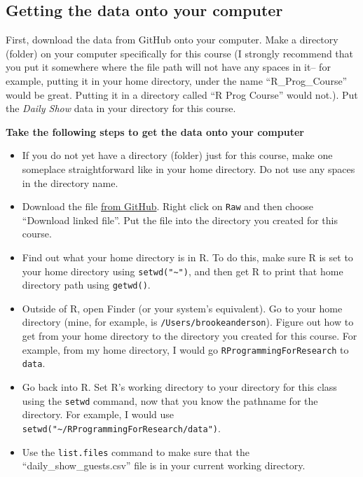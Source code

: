 \documentclass[]{book}
\providecommand{\tightlist}{%
  \setlength{\itemsep}{0pt}\setlength{\parskip}{0pt}}
\begin{document}
\subsection{Getting the data onto your
computer}\label{getting-the-data-onto-your-computer}

First, download the data from GitHub onto your computer. Make a
directory (folder) on your computer specifically for this course (I
strongly recommend that you put it somewhere where the file path will
not have any spaces in it-- for example, putting it in your home
directory, under the name ``R\_Prog\_Course'' would be great. Putting it
in a directory called ``R Prog Course'' would not.). Put the \emph{Daily
Show} data in your directory for this course.

\textbf{Take the following steps to get the data onto your computer}

\begin{itemize}
\tightlist
\item
  If you do not yet have a directory (folder) just for this course, make
  one someplace straightforward like in your home directory. Do not use
  any spaces in the directory name.
\item
  Download the file
  \href{https://github.com/geanders/RProgrammingForResearch/blob/master/data/daily_show_guests.csv}{from
  GitHub}. Right click on \texttt{Raw} and then choose ``Download linked
  file''. Put the file into the directory you created for this course.
\item
  Find out what your home directory is in R. To do this, make sure R is
  set to your home directory using \texttt{setwd("\textasciitilde{}")},
  and then get R to print that home directory path using
  \texttt{getwd()}.
\item
  Outside of R, open Finder (or your system's equivalent). Go to your
  home directory (mine, for example, is \texttt{/Users/brookeanderson}).
  Figure out how to get from your home directory to the directory you
  created for this course. For example, from my home directory, I would
  go \texttt{RProgrammingForResearch} to \texttt{data}.
\item
  Go back into R. Set R's working directory to your directory for this
  class using the \texttt{setwd} command, now that you know the pathname
  for the directory. For example, I would use
  \texttt{setwd("\textasciitilde{}/RProgrammingForResearch/data")}.
\item
  Use the \texttt{list.files} command to make sure that the
  ``daily\_show\_guests.csv'' file is in your current working directory.
\end{itemize}
\end{document}
